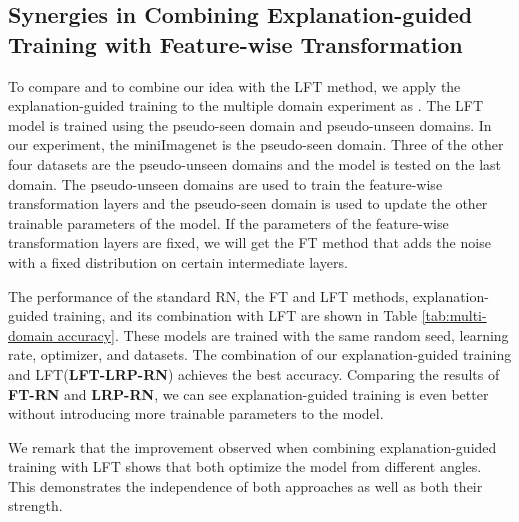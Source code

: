 \documentclass[a4paper,conference]{IEEEtran}
\begin{document}
\subsection{Synergies in Combining Explanation-guided Training with Feature-wise Transformation}
To compare and to combine our idea with the LFT method, we apply the explanation-guided training to the multiple domain experiment as \cite{FeaturewiseTranslayer:tseng2020cross}. The LFT model is trained using the pseudo-seen domain and pseudo-unseen domains. In our experiment, the miniImagenet is the pseudo-seen domain. Three of the other four datasets are the pseudo-unseen domains and the model is tested on the last domain. The pseudo-unseen domains are used to train the feature-wise transformation layers and the pseudo-seen domain is used to update the other trainable parameters of the model. If the parameters of the feature-wise transformation layers are fixed, we will get the FT method that adds the noise with a fixed distribution on certain intermediate layers. 

The performance of the standard RN, the FT and LFT methods, explanation-guided training, and its combination with LFT are shown in Table \ref{tab:multi-domain accuracy}. These models are trained with the same random seed, learning rate, optimizer, and datasets. The combination of our explanation-guided training and LFT(\textbf{LFT-LRP-RN}) achieves the best accuracy. Comparing the results of \textbf{FT-RN} and \textbf{LRP-RN}, we can see explanation-guided training is even better without introducing more trainable parameters to the model.

We remark that the improvement observed when combining explanation-guided training with LFT shows that both optimize the model from different angles. This demonstrates the independence of both approaches as well as both their strength.
\end{document}
